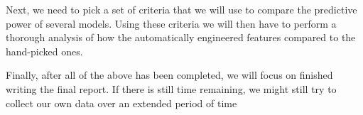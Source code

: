 Next, we need to pick a set of criteria that we will use to compare the predictive power of several models.
Using these criteria we will then have to perform a thorough analysis of how the automatically engineered features compared to the hand-picked ones.

Finally, after all of the above has been completed, we will focus on finished writing the final report.
If there is still time remaining, we might still try to collect our own data over an extended period of time

\endgroup
